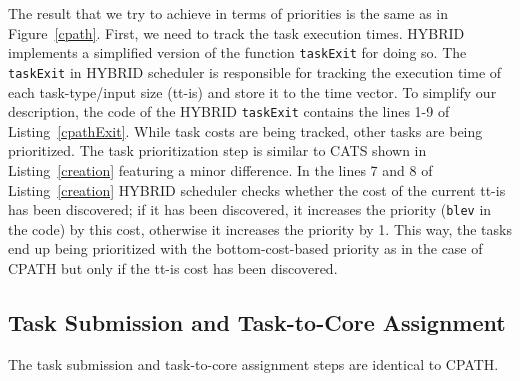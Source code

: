 The result that we try to achieve in terms of priorities is the same as in Figure~\ref{cpath}. 
First, we need to track the task execution times.
HYBRID implements a simplified version of the function \texttt{taskExit} for doing so. 
The \texttt{taskExit} in HYBRID scheduler is responsible for tracking the execution time of each task-type/input size (tt-is) and store it to the time vector.
To simplify our description, the code of the HYBRID \texttt{taskExit} contains the lines 1-9 of Listing~\ref{cpathExit}.
While task costs are being tracked, other tasks are being prioritized.
The task prioritization step is similar to CATS shown in Listing~\ref{creation} featuring a minor difference. 
In the lines 7 and 8 of Listing~\ref{creation} HYBRID scheduler checks whether the cost of the current tt-is has been discovered; if it has been discovered, it increases the priority (\texttt{blev} in the code) by this cost, otherwise it increases the priority by 1.
This way, the tasks end up being prioritized with the bottom-cost-based priority as in the case of CPATH but only if the tt-is cost has been discovered.

\subsection{Task Submission and Task-to-Core Assignment}
The task submission and task-to-core assignment steps are identical to CPATH.



